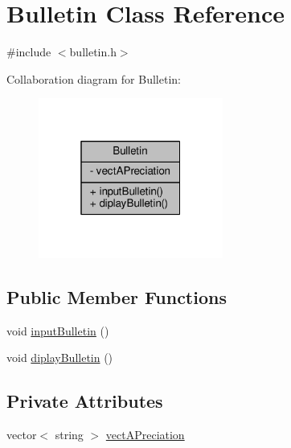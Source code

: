 \hypertarget{class_bulletin}{\section{Bulletin Class Reference}
\label{class_bulletin}
}


{\ttfamily \#include $<$bulletin.\+h$>$}



Collaboration diagram for Bulletin\+:\nopagebreak
\begin{figure}[H]
\begin{center}
\leavevmode
\includegraphics[width=172pt]{class_bulletin__coll__graph}
\end{center}
\end{figure}
\subsection*{Public Member Functions}
\begin{DoxyCompactItemize}
\item 
void \hyperlink{class_bulletin_ac116403c81f034712bf7cf41a281d650}{input\+Bulletin} ()
\item 
void \hyperlink{class_bulletin_aeb581b55746121f5eee9b23c0ef64804}{diplay\+Bulletin} ()
\end{DoxyCompactItemize}
\subsection*{Private Attributes}
\begin{DoxyCompactItemize}
\item 
vector$<$ string $>$ \hyperlink{class_bulletin_ac2ebf9657e81664fa0811f0aaccf825c}{vect\+A\+Preciation}
\end{DoxyCompactItemize}


